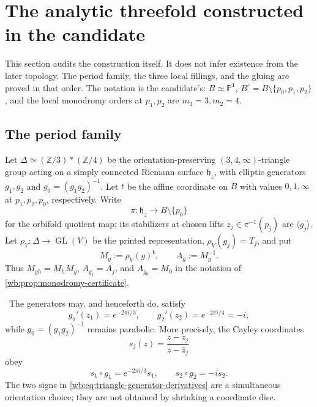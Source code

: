 \section{The analytic threefold constructed in the candidate}
\label{wb:sec:candidate-geometry}

This section audits the construction itself.  It does not infer existence
from the later topology.  The period family, the three local fillings, and
the gluing are proved in that order.  The notation is the candidate's:
\(B\simeq\mathbb P^1\),
\(B^\circ=B\setminus\{p_0,p_1,p_2\}\), and the local monodromy orders at
\(p_1,p_2\) are \(m_1=3,m_2=4\).

\subsection{The period family}

Let \(\Delta\simeq(\mathbb Z/3)*(\mathbb Z/4)\) be the orientation-preserving
\((3,4,\infty)\)-triangle group acting on a simply connected Riemann surface
\(\mathfrak h_z\), with elliptic generators \(g_1,g_2\) and
\(g_0=(g_1g_2)^{-1}\).  Let \(t\) be the affine coordinate on
\(B\) with values \(0,1,\infty\) at \(p_1,p_2,p_0\), respectively.
Write
\[
 \pi:\mathfrak h_z\longrightarrow B\setminus\{p_0\}
\]
for the orbifold quotient map; its stabilizers at chosen lifts
\(z_j\in\pi^{-1}(p_j)\) are \(\langle g_j\rangle\).  Let
\(\rho_V:\Delta\to\operatorname{GL}(V)\) be the printed representation,
\(\rho_V(g_j)=T_j\), and put
\[
 M_g:=\rho_V(g)^{\mathsf t},\qquad A_g:=M_g^{-1}.
\]
Thus \(M_{gh}=M_hM_g\), \(A_{g_j}=A_j\), and
\(A_{g_0}=M_0\) in the notation of \cref{wb:prop:monodromy-certificate}.

\begin{lemma}
\label{wb:lem:triangle-generator-orientations}
\ The generators may, and henceforth do, satisfy
\begin{equation}
 g_1'(z_1)=e^{-2\pi i/3},\qquad
 g_2'(z_2)=e^{-2\pi i/4}=-i,
\label{wb:eq:triangle-generator-derivatives}
\end{equation}
while \(g_0=(g_1g_2)^{-1}\) remains parabolic.  More precisely, the Cayley
coordinates
\begin{equation}
 s_j(z)=\frac{z-z_j}{z-\bar z_j}
\label{wb:eq:triangle-cayley-coordinates}
\end{equation}
obey
\begin{equation}
 s_1\circ g_1=e^{-2\pi i/3}s_1,
 \qquad
 s_2\circ g_2=-is_2.
\label{wb:eq:triangle-linearizing-identities}
\end{equation}
The two signs in \cref{wb:eq:triangle-generator-derivatives} are a simultaneous
orientation choice; they are not obtained by shrinking a coordinate disc.
\end{lemma}

